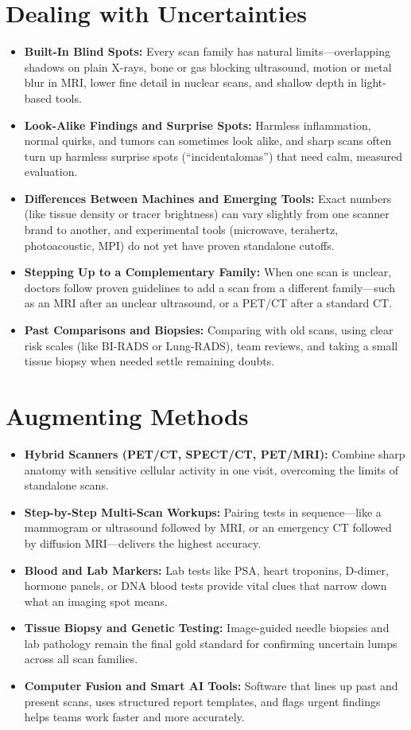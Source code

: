\section{Dealing with Uncertainties}
\begin{itemize}
  \item \textbf{Built-In Blind Spots:} Every scan family has natural limits---overlapping shadows on plain X-rays, bone or gas blocking ultrasound, motion or metal blur in MRI, lower fine detail in nuclear scans, and shallow depth in light-based tools.
  \item \textbf{Look-Alike Findings and Surprise Spots:} Harmless inflammation, normal quirks, and tumors can sometimes look alike, and sharp scans often turn up harmless surprise spots (``incidentalomas'') that need calm, measured evaluation.
  \item \textbf{Differences Between Machines and Emerging Tools:} Exact numbers (like tissue density or tracer brightness) can vary slightly from one scanner brand to another, and experimental tools (microwave, terahertz, photoacoustic, MPI) do not yet have proven standalone cutoffs.
  \item \textbf{Stepping Up to a Complementary Family:} When one scan is unclear, doctors follow proven guidelines to add a scan from a different family---such as an MRI after an unclear ultrasound, or a PET/CT after a standard CT.
  \item \textbf{Past Comparisons and Biopsies:} Comparing with old scans, using clear risk scales (like BI-RADS or Lung-RADS), team reviews, and taking a small tissue biopsy when needed settle remaining doubts.
\end{itemize}

\section{Augmenting Methods}
\begin{itemize}
  \item \textbf{Hybrid Scanners (PET/CT, SPECT/CT, PET/MRI):} Combine sharp anatomy with sensitive cellular activity in one visit, overcoming the limits of standalone scans.
  \item \textbf{Step-by-Step Multi-Scan Workups:} Pairing tests in sequence---like a mammogram or ultrasound followed by MRI, or an emergency CT followed by diffusion MRI---delivers the highest accuracy.
  \item \textbf{Blood and Lab Markers:} Lab tests like PSA, heart troponins, D-dimer, hormone panels, or DNA blood tests provide vital clues that narrow down what an imaging spot means.
  \item \textbf{Tissue Biopsy and Genetic Testing:} Image-guided needle biopsies and lab pathology remain the final gold standard for confirming uncertain lumps across all scan families.
  \item \textbf{Computer Fusion and Smart AI Tools:} Software that lines up past and present scans, uses structured report templates, and flags urgent findings helps teams work faster and more accurately.
\end{itemize}

